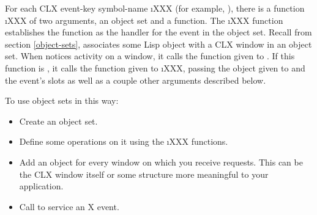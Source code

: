 For each CLX event-key symbol-name \i{XXX} (for example,
), there is a function \i{XXX} of two
arguments, an object set and a function.  The \i{XXX}
function establishes the function as the handler for the 
event in the object set.  Recall from section \ref{object-sets},
 associates some Lisp object with a
CLX window in an object set.  When  notices
activity on a window, it calls the function given to
.  If this function is
, it calls the function given to
\i{XXX}, passing the object given to
 and the event's slots as well as a
couple other arguments described below.

To use object sets in this way:

\begin{itemize} 
\item Create an object set.
  
\item Define some operations on it using the \i{XXX}
  functions.
  
\item Add an object for every window on which you receive requests.
  This can be the CLX window itself or some structure more meaningful
  to your application.
  
\item Call  to service an X event.
\end{itemize}


